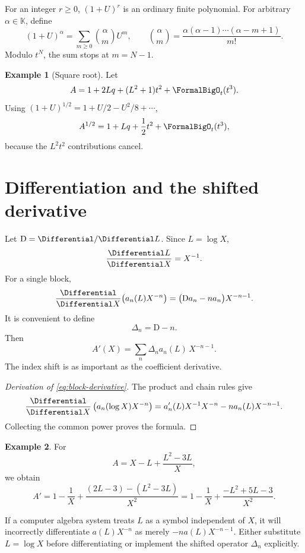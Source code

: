 \documentclass[11pt,openany]{book}
\theoremstyle{definition}
\newtheorem{example}{Example}[chapter]
\theoremstyle{plain}
\theoremstyle{remark}
\newcommand{\K}{\mathbb{K}}
\newcommand{\Dop}{\mathrm{D}}
\begin{document}
For an integer \(r\ge0\), \((1+U)^r\) is an ordinary finite polynomial.  For
arbitrary \(\alpha\in\K\), define
\begin{equation}\label{eq:formal-binomial}
 (1+U)^\alpha
 =\sum_{m\ge0}\binom{\alpha}{m}U^m,
 \qquad
 \binom{\alpha}{m}=
 \frac{\alpha(\alpha-1)\cdots(\alpha-m+1)}{m!}.
\end{equation}
Modulo \(t^N\), the sum stops at \(m=N-1\).

\begin{example}[Square root]
Let
\[
 A=1+2Lq+(L^2+1)t^2+\FormalBigO_t(t^3).
\]
Using \((1+U)^{1/2}=1+U/2-U^2/8+\cdots\),
\[
 A^{1/2}=1+Lq+\frac12t^2+\FormalBigO_t(t^3),
\]
because the \(L^2t^2\) contributions cancel.
\end{example}

\section{Differentiation and the shifted derivative}
Let \(\Dop=\Differential/\Differential L\).  Since \(L=\log X\),
\[
 \frac{\Differential L}{\Differential X}=X^{-1}.
\]
For a single block,
\begin{equation}\label{eq:block-derivative}
 \frac{\Differential}{\Differential X}\bigl(a_n(L)X^{-n}\bigr)
 =\bigl(\Dop a_n-na_n\bigr)X^{-n-1}.
\end{equation}
It is convenient to define
\begin{equation}\label{eq:Delta-n}
 \Delta_n=\Dop-n.
\end{equation}
Then
\begin{equation}\label{eq:derivative-series}
 A'(X)=\sum_n \Delta_n a_n(L)\,X^{-n-1}.
\end{equation}
The index shift is as important as the coefficient derivative.

\begin{proof}[Derivation of \cref{eq:block-derivative}]
The product and chain rules give
\[
 \frac{\Differential}{\Differential X}\left(a_n(\log X)X^{-n}\right)
 =a_n'(L)X^{-1}X^{-n}-na_n(L)X^{-n-1}.
\]
Collecting the common power proves the formula.
\end{proof}

\begin{example}
For
\[
 A=X-L+\frac{L^2-3L}{X},
\]
we obtain
\[
 A'=1-\frac1X
 +\frac{(2L-3)-(L^2-3L)}{X^2}
 =1-\frac1X+\frac{-L^2+5L-3}{X^2}.
\]
\end{example}

\begin{warningbox}
If a computer algebra system treats \(L\) as a symbol independent of \(X\), it
will incorrectly differentiate \(a(L)X^{-n}\) as merely
\(-na(L)X^{-n-1}\).  Either substitute \(L=\log X\) before differentiating or
implement the shifted operator \(\Delta_n\) explicitly.
\end{warningbox}
\end{document}
